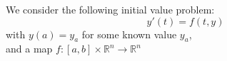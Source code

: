 \documentclass[17pt]{extarticle}
\begin{document}
We consider the following initial value problem:
$$
y'(t)=f(t,y)
$$
with $y(a)=y_a$ for some known value $y_a$,\\
and a map $f:[a,b]\times\mathbb{R}^n\rightarrow\mathbb{R}^n$
\end{document}
